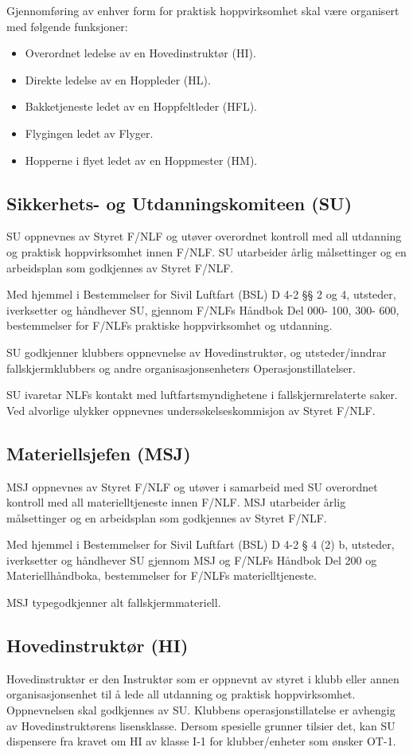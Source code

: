 Gjennomføring av enhver form for praktisk hoppvirksomhet skal være organisert med følgende funksjoner:
\begin{itemize}
	\item Overordnet ledelse av en Hovedinstruktør (HI).
	\item Direkte ledelse av en Hoppleder (HL).
	\item Bakketjeneste ledet av en Hoppfeltleder (HFL).
	\item Flygingen ledet av Flyger.
	\item Hopperne i flyet ledet av en Hoppmester (HM).
\end{itemize}

\subsection{Sikkerhets- og Utdanningskomiteen (SU)}
SU oppnevnes av Styret F/NLF og utøver overordnet kontroll med all utdanning og praktisk hoppvirksomhet innen F/NLF. SU utarbeider årlig målsettinger og en arbeidsplan som godkjennes av Styret F/NLF.

Med hjemmel i Bestemmelser for Sivil Luftfart (BSL) D 4-2 §§ 2 og 4, utsteder, iverksetter og håndhever SU, gjennom F/NLFs Håndbok Del 000- 100, 300- 600, bestemmelser for F/NLFs praktiske hoppvirksomhet og utdanning.

SU godkjenner klubbers oppnevnelse av Hovedinstruktør, og utsteder/inndrar fallskjermklubbers og andre organisasjonsenheters Operasjonstillatelser.

SU ivaretar NLFs kontakt med luftfartsmyndighetene i fallskjermrelaterte saker. Ved alvorlige ulykker oppnevnes undersøkelseskommisjon av Styret F/NLF.

\subsection{Materiellsjefen (MSJ)}
MSJ oppnevnes av Styret F/NLF og utøver i samarbeid med SU overordnet kontroll med all materielltjeneste innen F/NLF. MSJ utarbeider årlig målsettinger og en arbeidsplan som godkjennes av Styret F/NLF.

Med hjemmel i Bestemmelser for Sivil Luftfart (BSL) D 4-2 § 4 (2) b, utsteder, iverksetter og håndhever SU gjennom MSJ og F/NLFs Håndbok Del 200 og Materiellhåndboka, bestemmelser for F/NLFs materielltjeneste.

MSJ typegodkjenner alt fallskjermmateriell.

\subsection{Hovedinstruktør (HI)}
Hovedinstruktør er den Instruktør som er oppnevnt av styret i klubb eller annen organisasjonsenhet til å lede all utdanning og praktisk hoppvirksomhet. Oppnevnelsen skal godkjennes av SU. Klubbens operasjonstillatelse er avhengig av Hovedinstruktørens lisensklasse. Dersom spesielle grunner tilsier det, kan SU dispensere fra kravet om HI av klasse I-1 for klubber/enheter som ønsker OT-1.

